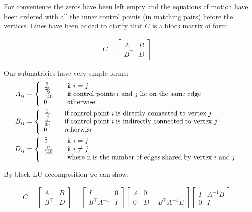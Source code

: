\documentclass{article}
\begin{document}
For convenience the zeros have been left empty and the equations of motion have been ordered 
with all the inner control points (in matching pairs) before the vertices. Lines have been 
added to clarify that $C$ is a block matrix of form:

\begin{align*}
C=\left[
\begin{array}{c|c}
A & B \\ \hline
B^{\top} & D
\end{array}\right]
\end{align*}

Our submatricies have very simple forms:
\begin{align*}
A_{ij} &= \left\{ 
  \begin{array}{l l}
    \frac{3}{35} & \quad \text{if $i=j$}\\
    \frac{9}{140} & \quad \text{if control points $i$ and $j$ lie on the same edge}\\
    0 & \quad \text{otherwise}\\
  \end{array} \right.\\
B_{ij} &= \left\{ 
  \begin{array}{l l}
    \frac{1}{14} & \quad \text{if control point $i$ is directly connected to vertex $j$}\\
    \frac{1}{35} & \quad \text{if control point $i$ is indirectly connected to vertex $j$}\\
    0 & \quad \text{otherwise}\\
  \end{array} \right.  \\ 
D_{ij} &= \left\{ 
  \begin{array}{l l}
    \frac{3}{7} & \quad \text{if $i=j$}\\
    \frac{n}{140} & \quad \text{if $i\neq j$}\\
    & \quad \text{where n is the number of edges shared by vertex $i$ and $j$}
  \end{array} \right.
\end{align*}

By block LU decomposition we can show:

\begin{align*}
C=
\begin{bmatrix} 
A & B \\ 
B^{\top} & D
\end{bmatrix} 
=
\begin{bmatrix} 
I & 0 \\ 
B^{\top}A^{-1} & I
\end{bmatrix}   
\begin{bmatrix} 
A & 0 \\ 
0 & D - B^{\top}A^{-1}B
\end{bmatrix}   
\begin{bmatrix} 
I & A^{-1}B \\ 
0 & I
\end{bmatrix}   
\end{align*}
 
\end{document}
